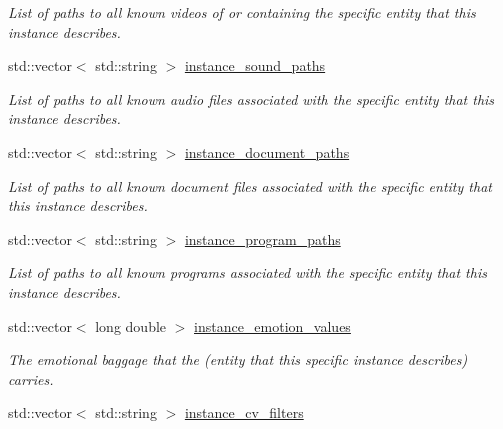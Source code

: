 \begin{DoxyCompactItemize}
\begin{DoxyCompactList}\small\item\em List of paths to all known videos of or containing the specific entity that this instance describes. \end{DoxyCompactList}\item 
std\+::vector$<$ std\+::string $>$ \hyperlink{classsheila_1_1Entity_abcda4f7e450d957470a34cc9337e86bb}{instance\+\_\+sound\+\_\+paths}\hypertarget{classsheila_1_1Entity_abcda4f7e450d957470a34cc9337e86bb}{}\label{classsheila_1_1Entity_abcda4f7e450d957470a34cc9337e86bb}

\begin{DoxyCompactList}\small\item\em List of paths to all known audio files associated with the specific entity that this instance describes. \end{DoxyCompactList}\item 
std\+::vector$<$ std\+::string $>$ \hyperlink{classsheila_1_1Entity_a3dc9786a10315ffc78936cc403316531}{instance\+\_\+document\+\_\+paths}\hypertarget{classsheila_1_1Entity_a3dc9786a10315ffc78936cc403316531}{}\label{classsheila_1_1Entity_a3dc9786a10315ffc78936cc403316531}

\begin{DoxyCompactList}\small\item\em List of paths to all known document files associated with the specific entity that this instance describes. \end{DoxyCompactList}\item 
std\+::vector$<$ std\+::string $>$ \hyperlink{classsheila_1_1Entity_adaf94800aeaa342f516aaa403fdf5ca0}{instance\+\_\+program\+\_\+paths}\hypertarget{classsheila_1_1Entity_adaf94800aeaa342f516aaa403fdf5ca0}{}\label{classsheila_1_1Entity_adaf94800aeaa342f516aaa403fdf5ca0}

\begin{DoxyCompactList}\small\item\em List of paths to all known programs associated with the specific entity that this instance describes. \end{DoxyCompactList}\item 
std\+::vector$<$ long double $>$ \hyperlink{classsheila_1_1Entity_a66fd50c80c5ce05eddb8c21c77471dda}{instance\+\_\+emotion\+\_\+values}\hypertarget{classsheila_1_1Entity_a66fd50c80c5ce05eddb8c21c77471dda}{}\label{classsheila_1_1Entity_a66fd50c80c5ce05eddb8c21c77471dda}

\begin{DoxyCompactList}\small\item\em The emotional baggage that the (entity that this specific instance describes) carries. \end{DoxyCompactList}\item 
std\+::vector$<$ std\+::string $>$ \hyperlink{classsheila_1_1Entity_a4949571bc1564f6d2c1796953efda688}{instance\+\_\+cv\+\_\+filters}\hypertarget{classsheila_1_1Entity_a4949571bc1564f6d2c1796953efda688}{}\label{classsheila_1_1Entity_a4949571bc1564f6d2c1796953efda688}


\end{DoxyCompactItemize}
